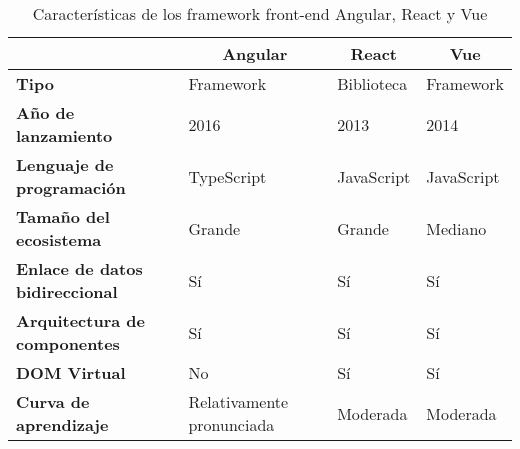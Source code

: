 \begin{footnotesize}
\begin{spacing}{1}
    \begin{center}

        \renewcommand*{\arraystretch}{1.4}
        \begin{longtable}[c]{ |>{\bfseries}p{} |p{} |p{}  |p{}|  }
            \caption[Características de los framework front-end Angular, React y Vue]{ Características de los framework front-end Angular, React y Vue\cite{wu_desarrollo_2014} } \\
            \hline
            \multicolumn{1}{|c|}{ \textbf{Característica}} & \multicolumn{1}{c|}{\textbf{Angular}} & \multicolumn{1}{c|}{ \textbf{React}} & \multicolumn{1}{c|}{ \textbf{Vue}} \\
            \hline
            Tipo                                         & Framework                        & Biblioteca                  & Framework                     \\
            \hline
            Año de lanzamiento                           & 2016                                 & 2013                                & 2014                              \\
            \hline
            Lenguaje de programación                     & TypeScript                           & JavaScript                          & JavaScript                        \\
            \hline
            Tamaño del ecosistema                        & Grande                               & Grande                              & Mediano                           \\
            \hline
            Enlace de datos bidireccional                & Sí                                   & Sí                                  & Sí                                \\
            \hline
            Arquitectura de componentes                  & Sí                                   & Sí                                  & Sí                                \\
            \hline
            DOM Virtual                                  & No                                   & Sí                                  & Sí                                \\
            \hline
            Curva de aprendizaje                         & Relativamente pronunciada            & Moderada                            & Moderada                          \\

\end{longtable}
\end{center}
\end{spacing}
\end{footnotesize}
